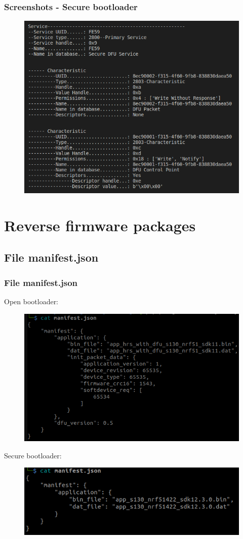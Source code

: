 \documentclass[34pt]{beamer}
\begin{document}
	\begin{frame}
		\frametitle{Screenshots - Secure bootloader}
		\begin{figure}[H]
			\centering
			\includegraphics[width=0.80\linewidth]{../project_Report/images/gatt-secure}
		\end{figure}
	\end{frame}

\section{Reverse firmware packages}
\subsection{File manifest.json}
\begin{frame}
	\frametitle{File manifest.json}
		Open bootloader:
	\begin{figure}[H]
		\includegraphics[width=0.6\linewidth]{../project_Report/images/manifest-open}
	\end{figure}
	Secure bootloader:
\begin{figure}[H]
	\includegraphics[width=0.6\linewidth]{../project_Report/images/manifest-secure}
\end{figure}

\end{frame}
\end{document}

